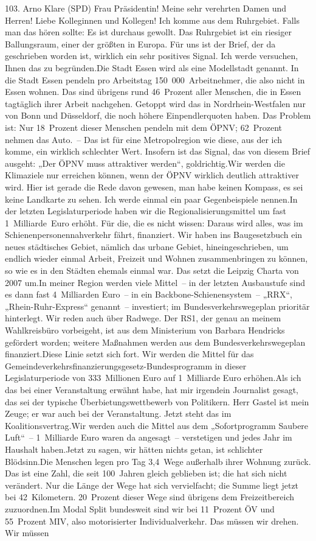 \documentclass{article}
\begin{document}
	103. Arno Klare (SPD) Frau Präsidentin! Meine sehr verehrten Damen und Herren! Liebe Kolleginnen und Kollegen! Ich komme aus dem Ruhrgebiet. Falls man das hören sollte: Es ist durchaus gewollt. Das Ruhrgebiet ist ein riesiger Ballungsraum, einer der größten in Europa. Für uns ist der Brief, der da geschrieben worden ist, wirklich ein sehr positives Signal. Ich werde versuchen, Ihnen das zu begründen.Die Stadt Essen wird als eine Modellstadt genannt. In die Stadt Essen pendeln pro Arbeitstag 150 000 Arbeitnehmer, die also nicht in Essen wohnen. Das sind übrigens rund 46 Prozent aller Menschen, die in Essen tagtäglich ihrer Arbeit nachgehen. Getoppt wird das in Nordrhein-Westfalen nur von Bonn und Düsseldorf, die noch höhere Einpendlerquoten haben. Das Problem ist: Nur 18 Prozent dieser Menschen pendeln mit dem ÖPNV; 62 Prozent nehmen das Auto. – Das ist für eine Metropolregion wie diese, aus der ich komme, ein wirklich schlechter Wert. Insofern ist das Signal, das von diesem Brief ausgeht: „Der ÖPNV muss attraktiver werden“, goldrichtig.Wir werden die Klimaziele nur erreichen können, wenn der ÖPNV wirklich deutlich attraktiver wird. Hier ist gerade die Rede davon gewesen, man habe keinen Kompass, es sei keine Landkarte zu sehen. Ich werde einmal ein paar Gegenbeispiele nennen.In der letzten Legislaturperiode haben wir die Regionalisierungsmittel um fast 1 Milliarde Euro erhöht. Für die, die es nicht wissen: Daraus wird alles, was im Schienenpersonennahverkehr fährt, finanziert. Wir haben ins Baugesetzbuch ein neues städtisches Gebiet, nämlich das urbane Gebiet, hineingeschrieben, um endlich wieder einmal Arbeit, Freizeit und Wohnen zusammenbringen zu können, so wie es in den Städten ehemals einmal war. Das setzt die Leipzig Charta von 2007 um.In meiner Region werden viele Mittel – in der letzten Ausbaustufe sind es dann fast 4 Milliarden Euro – in ein Backbone-Schienensystem – „RRX“, „Rhein-Ruhr-Express“ genannt – investiert; im Bundesverkehrswegeplan prioritär hinterlegt. Wir reden auch über Radwege. Der RS1, der genau an meinem Wahlkreisbüro vorbeigeht, ist aus dem Ministerium von Barbara Hendricks gefördert worden; weitere Maßnahmen werden aus dem Bundesverkehrswegeplan finanziert.Diese Linie setzt sich fort. Wir werden die Mittel für das Gemeindeverkehrsfinanzierungsgesetz-Bundesprogramm in dieser Legislaturperiode von 333 Millionen Euro auf 1 Milliarde Euro erhöhen.Als ich das bei einer Veranstaltung erwähnt habe, hat mir irgendein Journalist gesagt, das sei der typische Überbietungswettbewerb von Politikern. Herr Gastel ist mein Zeuge; er war auch bei der Veranstaltung. Jetzt steht das im Koalitionsvertrag.Wir werden auch die Mittel aus dem „Sofortprogramm Saubere Luft“ – 1 Milliarde Euro waren da angesagt – verstetigen und jedes Jahr im Haushalt haben.Jetzt zu sagen, wir hätten nichts getan, ist schlichter Blödsinn.Die Menschen legen pro Tag 3,4 Wege außerhalb ihrer Wohnung zurück. Das ist eine Zahl, die seit 100 Jahren gleich geblieben ist; die hat sich nicht verändert. Nur die Länge der Wege hat sich vervielfacht; die Summe liegt jetzt bei 42 Kilometern. 20 Prozent dieser Wege sind übrigens dem Freizeitbereich zuzuordnen.Im Modal Split bundesweit sind wir bei 11 Prozent ÖV und 55 Prozent MIV, also motorisierter Individualverkehr. Das müssen wir drehen. Wir müssen 
\end{document}
